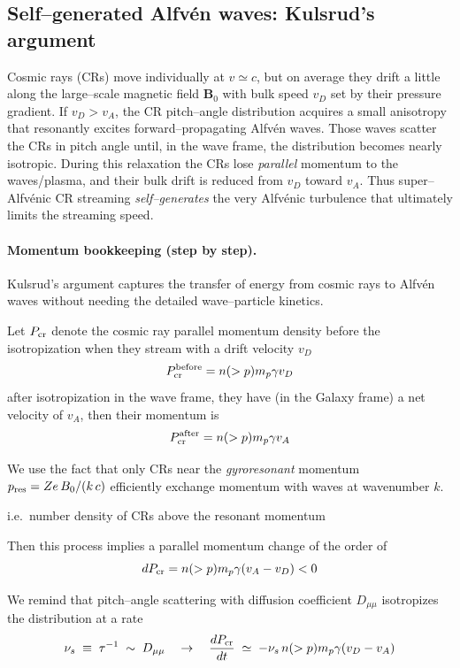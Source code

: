 
\subsection{Self–generated Alfv\'en waves: Kulsrud’s argument}

Cosmic rays (CRs) move individually at \(v\simeq c\), but on average they drift a little along the large–scale magnetic field \(\mathbf B_0\) with bulk speed \(v_D\) set by their
pressure gradient. If \(v_D>v_A\), the CR pitch–angle distribution acquires a small anisotropy that resonantly excites forward–propagating Alfv\'en waves. Those waves
scatter the CRs in pitch angle until, in the wave frame, the distribution becomes nearly isotropic. During this relaxation the CRs lose \emph{parallel} momentum to the
waves/plasma, and their bulk drift is reduced from \(v_D\) toward \(v_A\). Thus super–Alfv\'enic CR streaming \emph{self–generates} the very Alfv\'enic turbulence
that ultimately limits the streaming speed.

\paragraph{Momentum bookkeeping (step by step).}

Kulsrud’s argument captures the transfer of energy from cosmic rays to Alfv\'en waves without needing the detailed wave–particle kinetics.

Let \(P_{\rm cr}\) denote the cosmic ray parallel momentum density before the isotropization when they stream with a drift velocity \( v_D \)
%
\[
P_{\rm cr}^{\rm before} = n(>p) m_p \gamma v_D
\]
after isotropization in the wave frame, they have (in the Galaxy frame) a net velocity of \(v_A\), then their momentum is
\[
P_{\rm cr}^{\rm after} = n(>p) m_p \gamma v_A
\]

We use the fact that only CRs near the \emph{gyroresonant} momentum
\(p_{\rm res}=Ze\,B_0/(k\,c)\) efficiently exchange momentum with waves at wavenumber
\(k\). 

i.e.\ number density of CRs above the resonant momentum

Then this process implies a parallel momentum change of the order of
%
\[
dP_{\rm cr} = n(>p) m_p \gamma (v_A - v_D) < 0
\]

We remind that pitch–angle scattering with diffusion coefficient \(D_{\mu\mu}\) isotropizes
the distribution at a rate
\[
\nu_s \;\equiv\; \tau^{-1} \;\sim\; D_{\mu\mu}
\quad\rightarrow\quad
\frac{dP_{\rm cr}}{dt}\;\simeq\; -\nu_s\,n(>p) m_p \gamma (v_D - v_A)
\]

